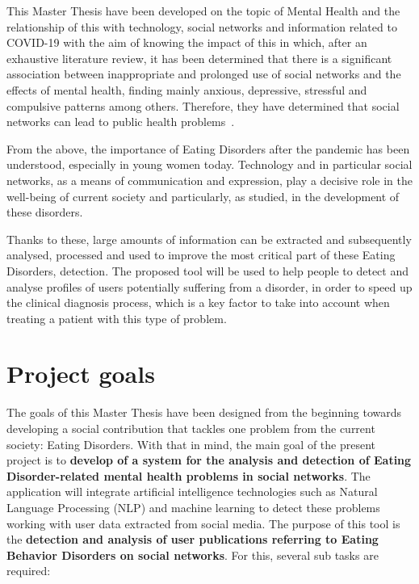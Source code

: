 This Master Thesis have been developed on the topic of Mental Health and the relationship of this with technology, social networks and information related to COVID-19 with the aim of knowing the impact of this in which, after an exhaustive literature review, it has been determined that there is a significant association between inappropriate and prolonged use of social networks and the effects of mental health, finding mainly anxious, depressive, stressful and compulsive patterns among others. Therefore, they have determined that social networks can lead to public health problems~\cite{pozo2022impacto}.

From the above, the importance of Eating Disorders after the pandemic has been understood, especially in young women today. Technology and in particular social networks, as a means of communication and expression, play a decisive role in the well-being of current society and particularly, as studied, in the development of these disorders.

Thanks to these, large amounts of information can be extracted and subsequently analysed, processed and used to improve the most critical part of these Eating Disorders, detection. The proposed tool will be used to help people to detect and analyse profiles of users potentially suffering from a disorder, in order to speed up the clinical diagnosis process, which is a key factor to take into account when treating a patient with this type of problem.


\section{Project goals}
\label{sec:goals}
The goals of this Master Thesis have been designed from the beginning towards developing a social contribution that tackles one problem from the current society: Eating Disorders. With that in mind, the main goal of the present project is to \textbf{develop of a system for the analysis and detection of Eating Disorder-related mental health problems in social networks}. The application will integrate artificial intelligence technologies such as Natural Language Processing (NLP) and machine learning to detect these problems working with user data extracted from social media. The purpose of this tool is the \textbf{detection and analysis of user publications referring to Eating Behavior Disorders on social networks}. For this, several sub tasks are required:

